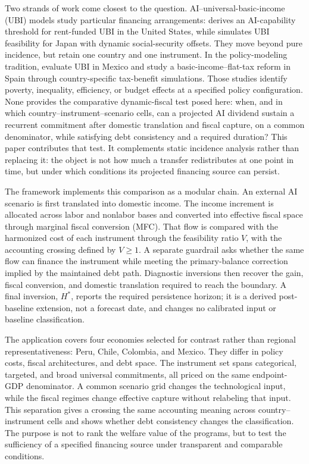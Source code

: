 Two strands of work come closest to the question. AI--universal-basic-income (UBI) models study particular financing arrangements: \citet{nayebi2025threshold} derives an AI-capability threshold for rent-funded UBI in the United States, while \citet{ito2026ubi} simulates UBI feasibility for Japan with dynamic social-security offsets. They move beyond pure incidence, but retain one country and one instrument. In the policy-modeling tradition, \citet{caamal2022ubi} evaluate UBI in Mexico and \citet{lara2026basic} study a basic-income--flat-tax reform in Spain through country-specific tax-benefit simulations. Those studies identify poverty, inequality, efficiency, or budget effects at a specified policy configuration. None provides the comparative dynamic-fiscal test posed here: when, and in which country--instrument--scenario cells, can a projected AI dividend sustain a recurrent commitment after domestic translation and fiscal capture, on a common denominator, while satisfying debt consistency and a required duration? This paper contributes that test. It complements static incidence analysis rather than replacing it: the object is not how much a transfer redistributes at one point in time, but under which conditions its projected financing source can persist.

The framework implements this comparison as a modular chain. An external AI scenario is first translated into domestic income. The income increment is allocated across labor and nonlabor bases and converted into effective fiscal space through marginal fiscal conversion (MFC). That flow is compared with the harmonized cost of each instrument through the feasibility ratio $V$, with the accounting crossing defined by $V\geq1$. A separate guardrail asks whether the same flow can finance the instrument while meeting the primary-balance correction implied by the maintained debt path. Diagnostic inversions then recover the gain, fiscal conversion, and domestic translation required to reach the boundary. A final inversion, $H^*$, reports the required persistence horizon; it is a derived post-baseline extension, not a forecast date, and changes no calibrated input or baseline classification.

The application covers four economies selected for contrast rather than regional representativeness: Peru, Chile, Colombia, and Mexico. They differ in policy costs, fiscal architectures, and debt space. The instrument set spans categorical, targeted, and broad universal commitments, all priced on the same endpoint-GDP denominator. A common scenario grid changes the technological input, while the fiscal regimes change effective capture without relabeling that input. This separation gives a crossing the same accounting meaning across country--instrument cells and shows whether debt consistency changes the classification. The purpose is not to rank the welfare value of the programs, but to test the sufficiency of a specified financing source under transparent and comparable conditions.

